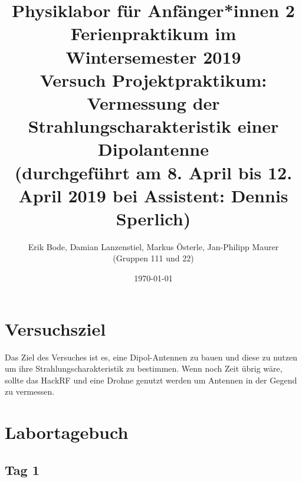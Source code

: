 \documentclass[titlepage,11pt,a4paper,ngerman]{article}
\begin{document}
\title{
	\large Physiklabor für Anfänger*innen 2 \\
	Ferienpraktikum im Wintersemester 2019 \\[4mm]
	\textbf{\LARGE 
		Versuch Projektpraktikum:\\[3mm]
		Vermessung der Strahlungscharakteristik einer Dipolantenne
			} \\[3mm]
	(durchgeführt am 8. April bis 12. April 2019 bei Assistent: Dennis Sperlich) \\}
\author{Erik Bode, Damian Lanzenstiel, Markus Österle, Jan-Philipp Maurer \\ (Gruppen 111 und 22)}
\date{\today}
\maketitle
\tableofcontents


\pagebreak

\section{Versuchsziel}

Das Ziel des Versuches ist es, eine Dipol-Antennen zu bauen und diese zu nutzen um ihre Strahlungscharakteristik zu bestimmen.\cite{LEIFI-EMWellem} Wenn noch Zeit übrig wäre, sollte das HackRF und eine Drohne genutzt werden um Antennen in der Gegend zu vermessen.

\section{Labortagebuch}

\subsection{Tag 1}
\end{document}

